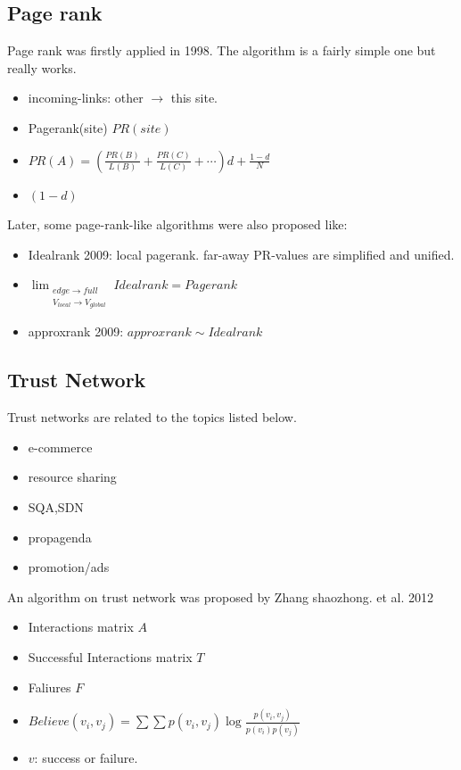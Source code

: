 \documentclass[UTF8, 11pt, a4paper]{ctexart}
\begin{document}
\subsection{Page rank}
Page rank was firstly applied in 1998. The algorithm is a fairly simple one but really works.
\begin{itemize}
\item incoming-links: other $\rightarrow$ this site.
\item Pagerank(site) $PR(site)$
\item $PR(A)=\left( \frac{PR(B)}{L(B)} + \frac{PR(C)}{L(C)} + \cdots \right)d + \frac{1-d}{N}$
\item $(1-d)$
\end{itemize}
Later, some page-rank-like algorithms were also proposed like:
\begin{itemize}
\item Idealrank 2009: local pagerank. far-away PR-values are simplified and unified.
\item $\lim_{\substack{edge \rightarrow full \\ V_{local} \rightarrow V_{global} } } Idealrank= Pagerank$
\item approxrank 2009:  $approxrank \sim Idealrank$
\end{itemize}

\subsection{Trust Network}
Trust networks are related to the topics listed below.
\begin{itemize}
\item e-commerce
\item resource sharing
\item SQA,SDN
\item propagenda
\item promotion/ads
\end{itemize}

An algorithm on trust network was proposed by Zhang shaozhong. et al.  2012
\begin{itemize}
\item Interactions matrix $A$
\item Successful Interactions matrix $T$
\item Faliures $F$
\item $Believe(v_i,v_j)=\sum \sum p(v_i,v_j) \log \frac{p(v_i,v_j)}{p(v_i)p(v_j)} $
\item $v$: success or failure.
\end{itemize}
\end{document}
